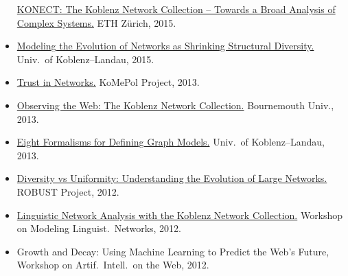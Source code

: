 \documentclass[line,mm]{res}
\newcounter{x}
\newcounter{y}
\newcommand{\talknumber}{T\arabic{y}\stepcounter{y}}
\begin{document}
\begin{resume}
\begin{itemize}
    \href{https://github.com/kunegis/pdfs/blob/master/kunegis:konect-eth.presentation.pdf}{KONECT:
      The Koblenz Network Collection -- Towards a Broad Analysis of Complex Systems.}  ETH Zürich, 2015.
  \item[{[\talknumber]}] 
    \href{https://github.com/kunegis/pdfs/blob/master/kunegis:shrinking-diversity.presentation.pdf}{Modeling
      the Evolution of Networks as Shrinking 
      Structural Diversity.}  Univ.\ of Koblenz--Landau, 2015. 
  \item[{[\talknumber]}]
    \href{https://github.com/kunegis/pdfs/blob/master/kunegis:konect-komepol.presentation.pdf}{Trust in Networks.}
    KoMePol Project, 2013. 
  \item[{[\talknumber]}] 
    \href{https://github.com/kunegis/pdfs/blob/master/kunegis:konect-bournemouth.presentation.pdf}{Observing
      the Web: The Koblenz Network Collection.}  Bournemouth Univ., 2013.
  \item[{[\talknumber]}] 
    \href{https://www.slideshare.net/kunegis/eight-ways}{Eight
      Formalisms for Defining Graph Models.}  Univ.\ of Koblenz--Landau,
    2013.  
  \item[{[\talknumber]}]
    \href{https://github.com/kunegis/pdfs/blob/master/kunegis:diversity-uniformity.presentation.pdf}{Diversity
      vs Uniformity:  Understanding the Evolution of Large Networks.}
    ROBUST Project, 2012. 
  \item[{[\talknumber]}] 
    \href{https://github.com/kunegis/pdfs/blob/master/kunegis:modeling-linguistic-networks.presentation.pdf}{Linguistic
      Network Analysis with the Koblenz Network Collection.}  
    Workshop on Modeling Linguist.\ Networks, 2012. 
  \item[{[\talknumber]}] Growth and Decay: Using Machine Learning to Predict the Web's
    Future, Workshop on Artif.\ Intell.\ on the Web, 2012. 

\end{itemize}
\end{resume}
\end{document}
